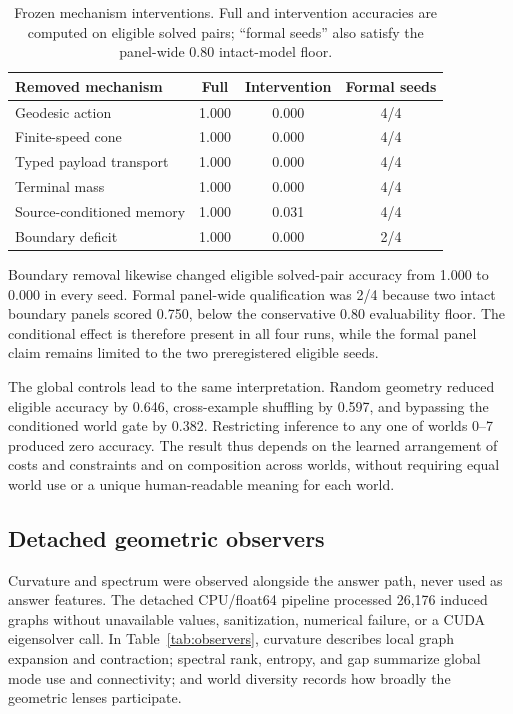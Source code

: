 \documentclass[11pt]{article}
\begin{document}
\begin{table}[t]
\centering
\caption{Frozen mechanism interventions. Full and intervention accuracies are
computed on eligible solved pairs; ``formal seeds'' also satisfy the panel-wide
0.80 intact-model floor.}
\label{tab:mechanisms}
\small
\begin{tabular}{@{}lccc@{}}
\toprule
Removed mechanism & Full & Intervention & Formal seeds \\
\midrule
Geodesic action & 1.000 & 0.000 & 4/4 \\
Finite-speed cone & 1.000 & 0.000 & 4/4 \\
Typed payload transport & 1.000 & 0.000 & 4/4 \\
Terminal mass & 1.000 & 0.000 & 4/4 \\
Source-conditioned memory & 1.000 & 0.031 & 4/4 \\
Boundary deficit & 1.000 & 0.000 & 2/4 \\
\bottomrule
\end{tabular}
\end{table}

Boundary removal likewise changed eligible solved-pair accuracy from 1.000 to
0.000 in every seed. Formal panel-wide qualification was 2/4 because two intact
boundary panels scored 0.750, below the conservative 0.80 evaluability floor.
The conditional effect is therefore present in all four runs, while the formal
panel claim remains limited to the two preregistered eligible seeds.

The global controls lead to the same interpretation. Random geometry reduced
eligible accuracy by 0.646, cross-example shuffling by 0.597, and bypassing the
conditioned world gate by 0.382. Restricting inference to any one of worlds
0--7 produced zero accuracy. The result thus depends on the learned arrangement
of costs and constraints and on composition across worlds, without requiring
equal world use or a unique human-readable meaning for each world.

\subsection{Detached geometric observers}

Curvature and spectrum were observed alongside the answer path, never used as
answer features. The detached CPU/float64 pipeline processed 26,176 induced
graphs without unavailable values, sanitization, numerical failure, or a CUDA
eigensolver call. In Table~\ref{tab:observers}, curvature describes local graph
expansion and contraction; spectral rank, entropy, and gap summarize global
mode use and connectivity; and world diversity records how broadly the
geometric lenses participate.
\end{document}
